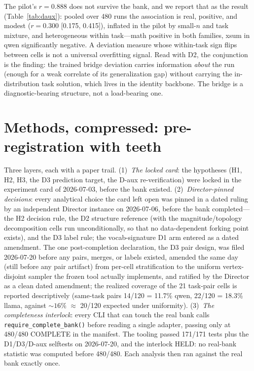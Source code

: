 \documentclass[10pt]{article}
\begin{document}
The pilot's $r = 0.888$ does not survive the bank, and we report that as
the result (Table~\ref{tab:daux}): pooled over 480 runs the association is
real, positive, and modest ($r = 0.300$ [0.175, 0.415]), inflated in the
pilot by small-$n$ and task mixture, and heterogeneous within task---math
positive in both families, xsum in qwen significantly negative. A deviation
measure whose within-task sign flips between cells is not a universal
overfitting signal. Read with D2, the conjunction is the finding: the
trained bridge deviation carries information \emph{about} the run (enough
for a weak correlate of its generalization gap) without carrying the
in-distribution task solution, which lives in the identity backbone. The
bridge is a diagnostic-bearing structure, not a load-bearing one.

\section{Methods, compressed: pre-registration with teeth}
\label{sec:methods}

Three layers, each with a paper trail. (1)~\emph{The locked card}: the
hypotheses (H1, H2, H3, the D3 prediction target, the D-aux
re-verification) were locked in the experiment card of 2026-07-03, before
the bank existed. (2)~\emph{Director-pinned decisions}: every analytical
choice the card left open was pinned in a dated ruling by an independent
Director instance on 2026-07-06, before the bank completed---the H2
decision rule, the D2 structure reference (with the magnitude/topology
decomposition cells run unconditionally, so that no data-dependent forking
point exists), and the D3 label rule; the vocab-signature D1 arm entered as
a dated amendment. The one post-completion declaration, the D3 pair design,
was filed 2026-07-20 before any pairs, merges, or labels existed, amended
the same day (still before any pair artifact) from per-cell stratification
to the uniform vertex-disjoint sampler the frozen tool actually implements,
and ratified by the Director as a clean dated amendment; the realized
coverage of the 21 task-pair cells is reported descriptively (same-task
pairs 14/120 = 11.7\% qwen, 22/120 = 18.3\% llama, against ${\sim}16\%$
$\approx$ 20/120 expected under uniformity). (3)~\emph{The completeness
interlock}: every CLI that can touch the real bank calls
\texttt{require\_complete\_bank()} before reading a single adapter, passing
only at 480/480 COMPLETE in the manifest. The tooling passed 171/171 tests
plus the D1/D3/D-aux selftests on 2026-07-20, and the interlock HELD: no
real-bank statistic was computed before 480/480. Each analysis then ran
against the real bank exactly once.
\end{document}
